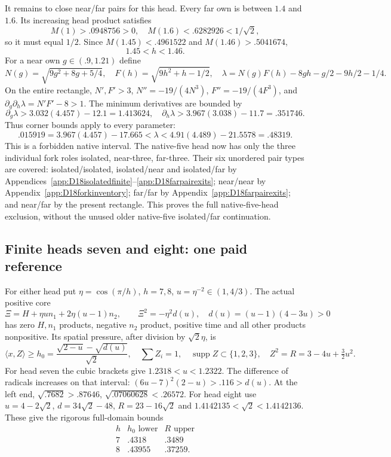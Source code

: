 \documentclass[11pt]{article}
\theoremstyle{definition}
\theoremstyle{remark}
\newcommand{\ip}[2]{\langle #1,#2\rangle}
\begin{document}
It remains to close near/far pairs for this head.
Every far own is between \(1.4\) and \(1.6\).
Its increasing head product satisfies
\[
 M(1)>.0948756>0,\quad M(1.6)<.6282926<1/\sqrt2,
\]
so it must equal \(1/2\).
Since \(M(1.45)<.4961522\) and \(M(1.46)>.5041674\),
\[
                              1.45<h<1.46 .
\]
For a near own \(g\in(.9,1.21)\) define
\[
 N(g)=\sqrt{9g^2+8g+5/4},\quad F(h)=\sqrt{9h^2+h-1/2},\quad
 \lambda=N(g)F(h)-8gh-g/2-9h/2-1/4 .
\]
On the entire rectangle,
\(N',F'>3\), \(N''=-19/(4N^3)\),
\(F''=-19/(4F^3)\), and
\(\partial_g\partial_h\lambda=N'F'-8>1\).
The minimum derivatives are bounded by
\[
 \partial_g\lambda>3.032(4.457)-12.1=1.413624,\quad
 \partial_h\lambda>3.967(3.038)-11.7=.351746 .
\]
Thus corner bounds apply to every parameter:
\[
 .015919=3.967(4.457)-17.665
       <\lambda<
 4.91(4.489)-21.5578=.48319 .
\]
This is a forbidden native interval.
The native-five head now has only the three individual fork roles
isolated, near-three, far-three.
Their six unordered pair types are covered:
isolated/isolated, isolated/near and isolated/far by
Appendices~\ref{app:D18isolatedfinite}--\ref{app:D18farpairexits};
near/near by Appendix~\ref{app:D18forkinventory};
far/far by Appendix~\ref{app:D18farpairexits};
and near/far by the present rectangle.
This proves the full native-five-head exclusion, without the
unused older native-five isolated/far continuation.

\subsection{Finite heads seven and eight: one paid reference}
\label{app:D18finite78reference}

For either head put \(\eta=\cos(\pi/h)\), \(h=7,8\),
\(u=\eta^{-2}\in(1,4/3)\).
The actual positive core
\[
 \Xi=H+\eta u n_1+2\eta(u-1)n_2,\qquad
 \Xi^2=-\eta^2d(u),\quad d(u)=(u-1)(4-3u)>0
\]
has zero \(H,n_1\) products, negative \(n_2\) product,
positive time and all other products nonpositive.
Its spatial pressure, after division by \(\sqrt2\eta\), is
\[
 \ip xZ\ge h_0={\frac{\sqrt{2-u}-\sqrt{d(u)}}{\sqrt2}},\quad
 \sum Z_i=1,\quad
 \operatorname{supp}Z\subset\{1,2,3\},\quad
 Z^2=R=3-4u+\tfrac32u^2 .
\]
For head seven the cubic brackets give
\(1.2318<u<1.2322\).
The difference of radicals increases on that interval:
\((6u-7)^2(2-u)>.116>d(u)\).
At the left end,
\(\sqrt{.7682}>.87646\), \(\sqrt{.07060628}<.26572\).
For head eight use
\(u=4-2\sqrt2\), \(d=34\sqrt2-48\), \(R=23-16\sqrt2\)
and \(1.4142135<\sqrt2<1.4142136\).
These give the rigorous full-domain bounds
\[
 \begin{array}{c|cc}
 h&h_0\text{ lower}&R\text{ upper}\\ \hline
 7&.4318&.3489\\
 8&.43955&.37259 .
 \end{array}
\]
\end{document}
